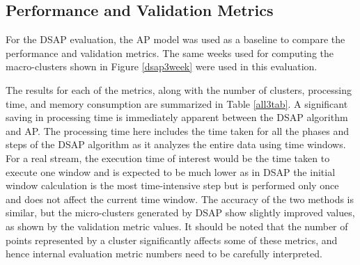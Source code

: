 


\subsection{Performance and Validation Metrics}

For the DSAP evaluation, the AP model was used as a baseline to compare the performance and validation metrics. The same weeks used for computing the macro-clusters shown in Figure \ref{dsap3week} were used in this evaluation.








The results for each of the metrics, along with the number of clusters, processing time, and memory consumption are summarized in Table \ref{all3tab}. A significant saving in processing time is immediately apparent between the DSAP algorithm and AP. The processing time here includes the time taken for all the phases and steps of the DSAP algorithm as it analyzes the entire data using time windows. For a real stream, the execution time of interest would be the time taken to execute one window and is expected to be much lower as in DSAP the initial window calculation is the most time-intensive step but is performed only once and does not affect the current time window. The accuracy of the two methods is similar, but the micro-clusters generated by DSAP show slightly improved values, as shown by the validation metric values. It should be noted that the number of points represented by a cluster significantly affects some of these metrics, and hence internal evaluation metric numbers need to be carefully interpreted.


